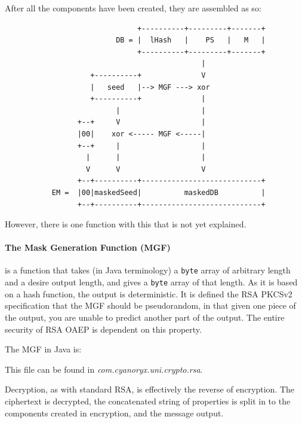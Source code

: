     After all the components have been created, they are assembled as so\cite{Jonsson:2003aa}:
    
    \begin{minipage}[b]{0.5\linewidth}
      \small\begin{verbatim}
                               +----------+---------+-------+
                          DB = |  lHash   |    PS   |   M   |
                               +----------+---------+-------+
                                              |
                    +----------+              V
                    |   seed   |--> MGF ---> xor
                    +----------+              |
                          |                   |
                 +--+     V                   |
                 |00|    xor <----- MGF <-----|
                 +--+     |                   |
                   |      |                   |
                   V      V                   V
                 +--+----------+----------------------------+
           EM =  |00|maskedSeed|          maskedDB          |
                 +--+----------+----------------------------+
      \end{verbatim}
    \end{minipage}
    
    However, there is one function with this that is not yet explained.
    
    \paragraph{The Mask Generation Function (MGF)}
    
    is a function that takes (in Java terminology) a \verb!byte! array of arbitrary length and a desire output length, and gives a \verb!byte! array of that length. As it is based on a hash function, the output is deterministic. It is defined the RSA PKCSv2 specification \cite{Jonsson:2003aa} that the MGF should be pseudorandom, in that given one piece of the output, you are unable to predict another part of the output. The entire security of RSA OAEP is dependent on this property. 
    
    The MGF in Java is:
    
    
    This file can be found in \emph{com.cyanoryx.uni.crypto.rsa}.
    
    Decryption, as with standard RSA, is effectively the reverse of encryption. The ciphertext is decrypted, the concatenated string of properties is split in to the components created in encryption, and the message output.
        
